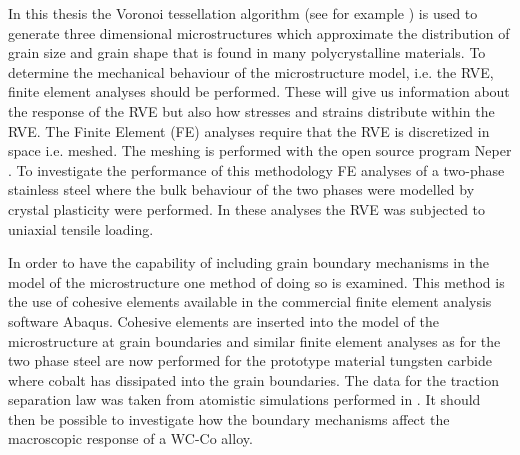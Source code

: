 \documentclass[introduction.tex]{subfiles}
\begin{document}
In this thesis the Voronoi tessellation algorithm (see for example \cite{voro}) is used to generate three dimensional microstructures which approximate the distribution of grain size and grain shape that is found in many polycrystalline materials. To determine the mechanical behaviour of the microstructure model, i.e. the RVE, finite element analyses should be performed. These will give us information about the response of the RVE but also how stresses and strains distribute within the RVE. The Finite Element (FE) analyses require that the RVE is discretized in space i.e. meshed. The meshing is performed with the open source program Neper \cite{Quey20111729}.  To investigate the performance of this methodology FE analyses of a two-phase stainless steel where the bulk behaviour of the two phases were modelled by crystal plasticity were performed. In these analyses the RVE was subjected to uniaxial tensile loading.

In order to have the capability of including grain boundary mechanisms in the model of the microstructure one method of doing so is examined. This method is the use of cohesive elements available in the commercial finite element analysis software Abaqus. Cohesive elements are inserted into the model of the microstructure at grain boundaries and similar finite element analyses as for the two phase steel are now performed for the prototype material tungsten carbide where cobalt has dissipated into the grain boundaries. The data for the traction separation law was taken from atomistic simulations performed in \cite{Gren2013}. It should then be possible to investigate how the boundary mechanisms affect the macroscopic response of a WC-Co alloy.
\end{document}
